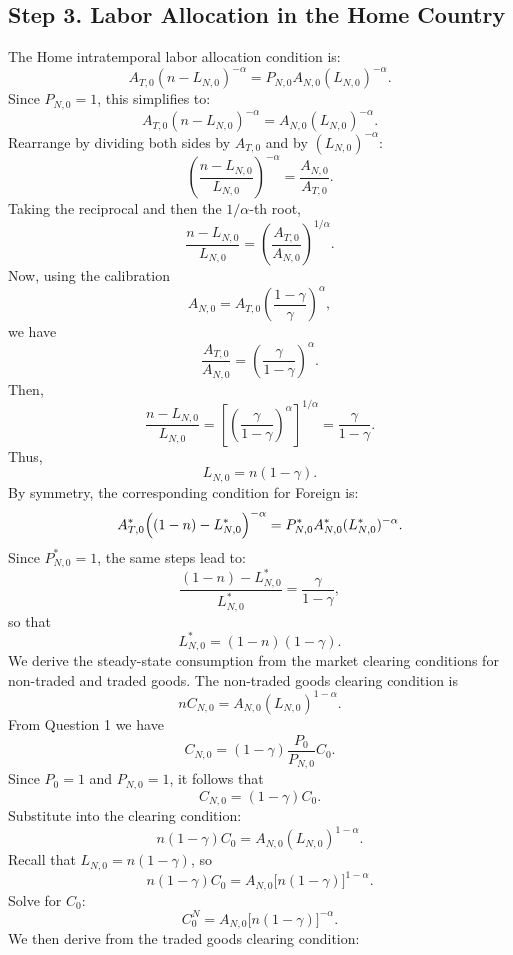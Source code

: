 \documentclass[a4paper,12pt]{article} %
\theoremstyle{nonitalic}
\begin{document}
\subsection*{Step 3. Labor Allocation in the Home Country}
The Home intratemporal labor allocation condition is:
\[
A_{T,0} (n-L_{N,0})^{-\alpha} = P_{N,0} A_{N,0} (L_{N,0})^{-\alpha}.
\]
Since $P_{N,0}=1$, this simplifies to:
\[
A_{T,0} (n-L_{N,0})^{-\alpha} = A_{N,0} (L_{N,0})^{-\alpha}.
\]
Rearrange by dividing both sides by $A_{T,0}$ and by $(L_{N,0})^{-\alpha}$:
\[
\left(\frac{n-L_{N,0}}{L_{N,0}}\right)^{-\alpha} = \frac{A_{N,0}}{A_{T,0}}.
\]
Taking the reciprocal and then the $1/\alpha$-th root,
\[
\frac{n-L_{N,0}}{L_{N,0}} = \left(\frac{A_{T,0}}{A_{N,0}}\right)^{1/\alpha}.
\]
Now, using the calibration 
\[
A_{N,0} = A_{T,0}\left(\frac{1-\gamma}{\gamma}\right)^{\alpha},
\]
we have
\[
\frac{A_{T,0}}{A_{N,0}} = \left(\frac{\gamma}{1-\gamma}\right)^{\alpha}.
\]
Then,
\[
\frac{n-L_{N,0}}{L_{N,0}} = \left[\left(\frac{\gamma}{1-\gamma}\right)^{\alpha}\right]^{1/\alpha} = \frac{\gamma}{1-\gamma}.
\]
Thus,
\[
\boxed{L_{N,0} = n(1-\gamma).}
\]
By symmetry, the corresponding condition for Foreign is:
\[
A^*_{T,0}\Bigl((1-n)-L^*_{N,0}\Bigr)^{-\alpha} = P^*_{N,0} A^*_{N,0} (L^*_{N,0})^{-\alpha}.
\]
Since $P^*_{N,0}=1$, the same steps lead to:
\[
\frac{(1-n)-L^*_{N,0}}{L^*_{N,0}} = \frac{\gamma}{1-\gamma},
\]
so that
\[
\boxed{L^*_{N,0} = (1-n)(1-\gamma).}
\]
We derive the steady-state consumption from the market clearing conditions for non-traded and traded goods.
The non-traded goods clearing condition is
\[
n C_{N,0} = A_{N,0} (L_{N,0})^{1-\alpha}.
\]
From Question 1 we have
\[
C_{N,0} = (1-\gamma) \frac{P_0}{P_{N,0}} C_0.
\]
Since $P_0=1$ and $P_{N,0}=1$, it follows that
\[
C_{N,0} = (1-\gamma) C_0.
\]
Substitute into the clearing condition:
\[
n (1-\gamma) C_0 = A_{N,0} (L_{N,0})^{1-\alpha}.
\]
Recall that $L_{N,0} = n(1-\gamma)$, so
\[
n (1-\gamma) C_0 = A_{N,0} \bigl[n(1-\gamma)\bigr]^{1-\alpha}.
\]
Solve for $C_0$:
\[
C_0^N = A_{N,0}  \bigl[n(1-\gamma)\bigr]^{-\alpha}.
\]
We then derive from the traded goods clearing condition:
\end{document}
